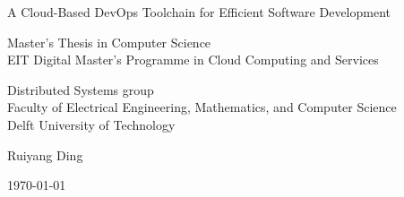 \begin{titlepage}

  \begin{center}
  \null\vfill
    \begin{center}
    \LARGE{A Cloud-Based DevOps Toolchain for Efficient Software Development}
    \end{center}

    \vspace{3cm}

    \begin{large}
    Master's Thesis in Computer Science\\
    EIT Digital Master’s Programme in Cloud Computing and Services
    \end{large}

    \vspace{1.5cm}

    \begin{normalsize}
    Distributed Systems group\\
    Faculty of Electrical Engineering, Mathematics, and Computer Science\\
    Delft University of Technology
    \end{normalsize}

    \vspace{2.0cm}

    \begin{normalsize}
Ruiyang Ding
    \end{normalsize}

    \vspace{1.0cm}

    \today            %

  \vfill
  \end{center}

\end{titlepage}

